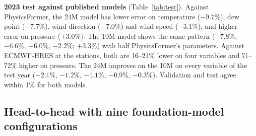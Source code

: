 \documentclass{article}
\begin{document}
\textbf{2023 test against published models} (Table~\ref{tab:test}). Against PhysicsFormer, the 24M model has lower
error on temperature ($-9.7\%$), dew point ($-7.7\%$), wind direction ($-7.0\%$) and wind speed ($-3.1\%$), and higher
error on pressure ($+3.0\%$). The 10M model shows the same pattern ($-7.8\%$, $-6.6\%$, $-6.0\%$, $-2.2\%$; $+3.3\%$)
with half PhysicsFormer's parameters. Against ECMWF-HRES at the stations, both are 16--21\% lower on four variables
and 71--72\% higher on pressure. The 24M improves on the 10M on every variable of the test year ($-2.1\%$, $-1.2\%$,
$-1.1\%$, $-0.9\%$, $-0.3\%$). Validation and test agree within 1\% for both models.

\subsection{Head-to-head with nine foundation-model configurations}
\label{sec:h2h}
\end{document}
